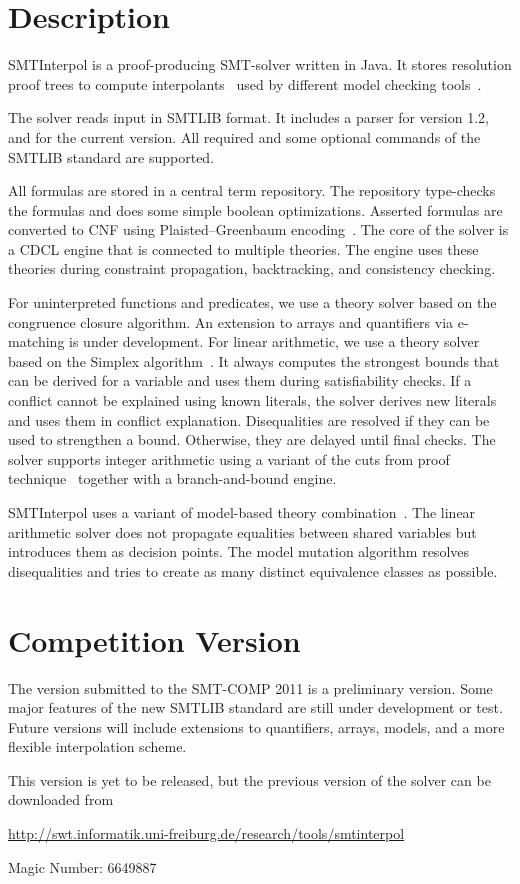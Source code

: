 \documentclass{article}
\title{\SI\\{\large Version \version}}
\author{J\"urgen Christ, Jochen Hoenicke\\
  University of Freiburg\\
  \texttt{\{christj,hoenicke\}@informatik.uni-freiburg.de}}
\newcommand\SI{SMTInterpol\xspace}
\begin{document}
\maketitle
\section*{Description}
\SI is a proof-producing SMT-solver written in Java.  It stores resolution proof trees to
compute interpolants~\cite{mcmillan05itp} used by different model checking
tools~\cite{HHP09,HHP10}.

The solver reads input in SMTLIB format.  It includes a parser for version
1.2, and for the current version.  All required and some optional commands of
the SMTLIB standard are supported.

All formulas are stored in a central term repository.  The repository
type-checks the formulas and does some simple boolean optimizations.  Asserted
formulas are converted to CNF using Plaisted--Greenbaum
encoding~\cite{DBLP:journals/jsc/PlaistedG86}.  The core of the solver is a
CDCL engine that is connected to multiple theories.  The engine uses these
theories during constraint propagation, backtracking, and consistency
checking.

For uninterpreted functions and predicates, we use a theory solver based on
the congruence closure algorithm.  An extension to arrays and quantifiers via
e-matching is under development.  For linear arithmetic, we use a theory
solver based on the Simplex algorithm~\cite{DBLP:conf/cav/DutertreM06}.  It
always computes the strongest bounds that can be derived for a variable and
uses them during satisfiability checks.  If a conflict cannot be explained
using known literals, the solver derives new literals and uses them in
conflict explanation.  Disequalities are resolved if they can be used to
strengthen a bound.  Otherwise, they are delayed until final checks.  The
solver supports integer arithmetic using a variant of the cuts from proof
technique~\cite{DBLP:conf/cav/DilligDA09} together with a branch-and-bound
engine.

\SI uses a variant of model-based theory
combination~\cite{DBLP:journals/entcs/MouraB08}.  The linear arithmetic solver
does not propagate equalities between shared variables but introduces them as
decision points.  The model mutation algorithm resolves disequalities
and tries to create as many distinct equivalence classes as possible.

\section*{Competition Version}
The version submitted to the SMT-COMP 2011 is a preliminary version.  Some
major features of the new SMTLIB standard are still under development or
test.  Future versions will include extensions to quantifiers, arrays, models,
and a more flexible interpolation scheme.

This version is yet to be released, but the previous version of the solver can
be downloaded from
\begin{center}
  \url{http://swt.informatik.uni-freiburg.de/research/tools/smtinterpol}
\end{center}

Magic Number: 6649887



\end{document}
